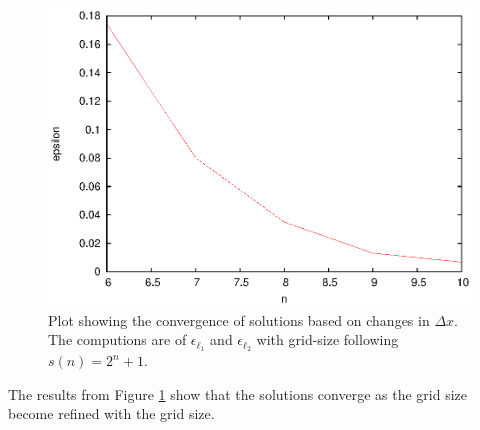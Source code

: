  \begin{figure}
    \centering
    \includegraphics{converge_spatial}
    \caption{Plot showing the convergence of solutions based on changes in $\Delta x$. The computions are of $\epsilon_{\ell_1}$ and $\epsilon_{\ell_2}$ with grid-size following $s(n) = 2^{n}+1$.}
    \label{fig:converge_spatial}
  \end{figure}

  The results from Figure \ref{fig:converge_spatial} show that the solutions converge as the grid size become refined with the grid size.


%
%
%
 
